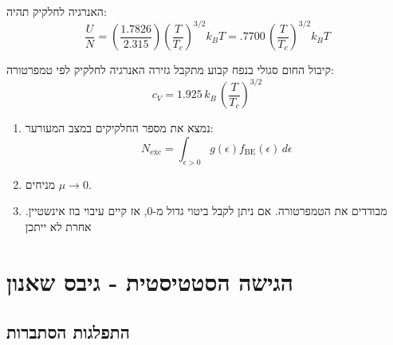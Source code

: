 \documentclass{tstextbook}
\begin{document}
\begin{corollary}
האנרגיה לחלקיק תהיה:
$${\frac{U}{N}}=\left({\frac{1.7826}{2.315}}\right)\left({\frac{T}{T_c}}\right)^{3/2}k_{B}T=.7700\,\left({\frac{T}{T_c}}\right)^{3/2}k_{B}T$$

\end{corollary}
\begin{corollary}
קיבול החום סגולי בנפח קבוע מתקבל גזירה האנרגיה לחלקיק לפי טמפרטורה:
$$c_{V}=1.925\,k_{B}\,\left(\frac{T}{T_c}\right)^{3/2}$$

\end{corollary}
\begin{proposition}
  \begin{enumerate}
    \item נמצא את מספר החלקיקים במצב המעורער: 
$$N_{\mathrm{exc}}=\int_{\epsilon>0}g(\epsilon)f_{\mathrm{BE}}(\epsilon)\,d\epsilon$$


    \item מניחים \(\mu\to 0\).  


    \item מבודדים את הטמפרטורה. אם ניתן לקבל ביטוי גדול מ-0, אז קיים עיבוי בוז אינשטיין. אחרת לא ייתכן 


  \end{enumerate}
\end{proposition}
\begin{example}
\end{example}
\chapter{הגישה הסטטיסטית - גיבס שאנון}

\section{התפלגות הסתברות}
\end{document}
